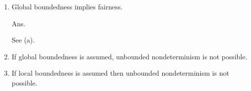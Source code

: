 \documentclass{article}
\begin{document}
\begin{enumerate}
\begin{enumerate}
\item Global boundedness implies fairness.

Ans.

See (a).

\item If global boundedness is assumed, unbounded nondeterminism is not 
possible.

\item If local boundedness is assumed then unbounded nondeterminism is not 
possible.

\end{enumerate}
\end{enumerate}
\end{document}
